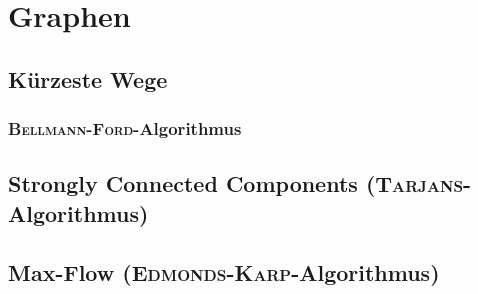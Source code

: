 \section{Graphen}

\subsection{Kürzeste Wege}

\subsubsection{\textsc{Bellmann-Ford}-Algorithmus}


\subsection{Strongly Connected Components (\textsc{Tarjans}-Algorithmus)}


\subsection{Max-Flow (\textsc{Edmonds-Karp}-Algorithmus)}
